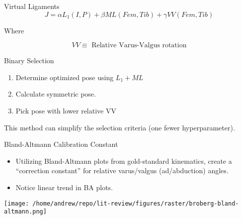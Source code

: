 \documentclass[presentation, aspectratio=1610]{beamer}
\begin{document}
\begin{frame}[label={sec:org189c468}]{Virtual Ligaments}
\begin{equation*}
  J = \alpha L_{1}(I,P) + \beta ML(Fem,Tib) + \gamma VV(Fem,Tib)
\end{equation*}

Where

\begin{equation*}
  VV \equiv \text{  Relative Varus-Valgus rotation}
\end{equation*}
\end{frame}

\begin{frame}[label={sec:orge1dfb86}]{Binary Selection}
\begin{enumerate}
\item Determine optimized pose using \(L_1 + ML\)
\item Calculate symmetric pose.
\item Pick pose with lower relative VV
\end{enumerate}

This method can simplify the selection criteria (one fewer hyperparameter).
\end{frame}
\begin{frame}[label={sec:org0cd8b36}]{Bland-Altmann Calibration Constant}
\begin{itemize}
\item Utilizing Bland-Altmann plots from gold-standard kinematics, create a ``correction constant'' for relative varus/valgus (ad/abduction) angles.
\item Notice linear trend in BA plots.
\end{itemize}
\begin{center}
\texttt{[image: /home/andrew/repo/lit-review/figures/raster/broberg-bland-altmann.png]}
\end{center}
\end{frame}
\end{document}
